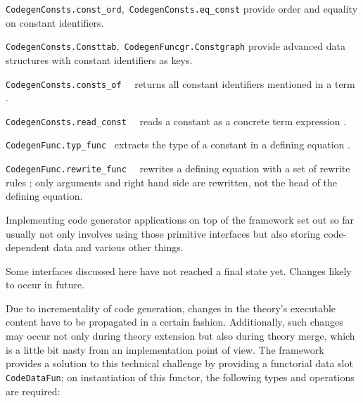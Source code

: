 \begin{isabellebody}
\begin{isamarkuptext}
  \begin{description}

  \item \verb|CodegenConsts.const_ord|,~\verb|CodegenConsts.eq_const|
     provide order and equality on constant identifiers.

  \item \verb|CodegenConsts.Consttab|,~\verb|CodegenFuncgr.Constgraph|
     provide advanced data structures with constant identifiers as keys.

  \item \verb|CodegenConsts.consts_of|~~
     returns all constant identifiers mentioned in a term .

  \item \verb|CodegenConsts.read_const|~~
     reads a constant as a concrete term expression .

  \item \verb|CodegenFunc.typ_func|~
     extracts the type of a constant in a defining equation .

  \item \verb|CodegenFunc.rewrite_func|~~
     rewrites a defining equation  with a set of rewrite
     rules ; only arguments and right hand side are rewritten,
     not the head of the defining equation.

  \end{description}%
\end{isamarkuptext}%
\isamarkuptrue%
%
\endisatagmlref
{\isafoldmlref}%
%
\isadelimmlref
%
\endisadelimmlref
%
\isamarkuptrue%
%
\begin{isamarkuptext}%
Implementing code generator applications on top
  of the framework set out so far usually not only
  involves using those primitive interfaces
  but also storing code-dependent data and various
  other things.

  \begin{warn}
    Some interfaces discussed here have not reached
    a final state yet.
    Changes likely to occur in future.
  \end{warn}%
\end{isamarkuptext}%
\isamarkuptrue%
%
\isamarkuptrue%
%
\begin{isamarkuptext}%
Due to incrementality of code generation, changes in the
  theory's executable content have to be propagated in a
  certain fashion.  Additionally, such changes may occur
  not only during theory extension but also during theory
  merge, which is a little bit nasty from an implementation
  point of view.  The framework provides a solution
  to this technical challenge by providing a functorial
  data slot \verb|CodeDataFun|; on instantiation
  of this functor, the following types and operations
  are required:


\end{isamarkuptext}
\end{isabellebody}
